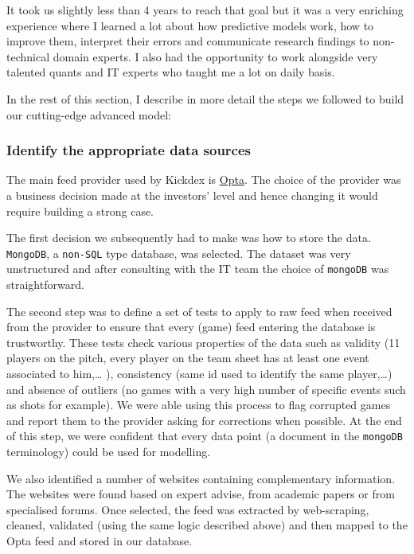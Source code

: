\documentclass[11pt]{article}
\begin{document}
It took us slightly less than 4 years to reach that goal but it was a very
enriching experience where I learned a lot about how predictive models work,
how to improve them, interpret their errors and communicate research findings
to non-technical domain experts. I also had the opportunity to work alongside
very talented quants and IT experts who taught me a lot on daily basis.

In the rest of this section, I describe in more detail the steps we followed
to build our cutting-edge advanced model:
\subsubsection{Identify the appropriate data sources}
\label{sec:org3c73ebb}
The main feed provider used by Kickdex is \href{https://www.optasports.com/}{Opta}. The choice of the provider
was a business decision made at the investors' level and hence changing it
would require building a strong case.

The first decision we subsequently had to make was how to store the data.
\texttt{MongoDB}, a \texttt{non-SQL} type database, was selected. The dataset was very
unstructured and after consulting with the IT team the choice of \texttt{mongoDB}
was straightforward.

The second step was to define a set of tests to apply to raw feed when
received from the provider to ensure that every (game) feed entering the
database is trustworthy. These tests check various properties of the data
such as validity (11 players on the pitch, every player on the team sheet
has at least one event associated to him,\ldots{} ), consistency (same id used to
identify the same player,\ldots{}) and absence of outliers (no games with a very
high number of specific events such as shots for example). We were able
using this process to flag corrupted games and report them to the provider
asking for corrections when possible. At the end of this step, we were
confident that every data point (a document in the \texttt{mongoDB} terminology)
could be used for modelling.

We also identified a number of websites containing complementary
information. The websites were found based on expert advise, from academic
papers or from specialised forums. Once selected, the feed was extracted by
web-scraping, cleaned, validated (using the same logic described above) and
then mapped to the Opta feed and stored in our database.
\end{document}
